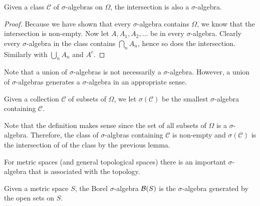 \begin{lem}Given a class $\mathcal{C}$ of $\sigma$-algebras on
  $\Omega$, the intersection is also a $\sigma$-algebra.
\end{lem}
\begin{proof}
Because we have shown that every $\sigma$-algebra contains $\Omega$,
we know that the intersection is non-empty.  Now let $A, A_1, A_2, \dots$
be in every $\sigma$-algebra.  Clearly every $\sigma$-algebra in the
class contains $\bigcap_n A_n$, hence so does the intersection.
Similarly with $\bigcup_n A_n$ and $A^c$.
\end{proof}
Note that a union of $\sigma$-algebras is not necessarily a
$\sigma$-algebra.  However, a union of $\sigma$-algebras generates a
$\sigma$-algebra in an appropriate sense.
\begin{defn}Given a collection $\mathcal{C}$ of subsets of $\Omega$,
  we let $\sigma(\mathcal{C})$ be the smallest $\sigma$-algebra
  containing $\mathcal{C}$.
\end{defn}
Note that the definition makes sense since the set of all subsets of
$\Omega$ is a $\sigma$-algebra.  Therefore, the class of
$\sigma$-algbras containing $\mathcal{C}$ is non-empty and
$\sigma(\mathcal{C})$ is the intersection of of the class by the
previous lemma.

For metric spaces (and general topological spaces) there is an
important $\sigma$-algebra that is associated with the topology.
\begin{defn}Given a metric space $S$, the Borel $\sigma$-algebra
  $\mathcal{B}(S)$ is the $\sigma$-algebra generated by the open sets on $S$.
\end{defn}


